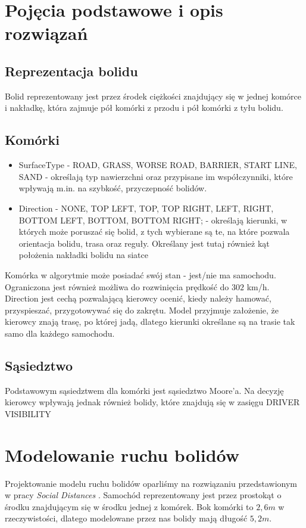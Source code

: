 \documentclass{article}
\begin{document}
\section{Pojęcia podstawowe i opis rozwiązań}
\subsection{Reprezentacja bolidu}
Bolid reprezentowany jest przez środek ciężkości znajdujący się w jednej komórce i nakładkę, która zajmuje pół komórki z przodu i pół komórki z tyłu bolidu.

\subsection{Komórki}
\begin{itemize}
\item SurfaceType - ROAD, GRASS, WORSE ROAD, BARRIER, START LINE, SAND - określają typ nawierzchni oraz przypisane im współczynniki, które wpływają m.in. na szybkość, przyczepność bolidów. 
\item Direction -  NONE, TOP LEFT, TOP, TOP RIGHT, LEFT, RIGHT, BOTTOM LEFT, BOTTOM, BOTTOM RIGHT; - określają kierunki, w których może poruszać się bolid, z tych wybierane są te, na które pozwala orientacja bolidu, trasa oraz reguły. Określany jest tutaj również kąt położenia nakładki bolidu na siatce
\end{itemize}

Komórka w algorytmie może posiadać swój stan - jest/nie ma samochodu. Ograniczona jest również możliwa do rozwinięcia prędkość do $302$ km/h. \\

Direction jest cechą pozwalającą kierowcy ocenić, kiedy należy hamować, przyspieszać, przygotowywać się do zakrętu. Model przyjmuje założenie, że kierowcy znają trasę, po której jadą, dlatego kierunki określane są na trasie tak samo dla każdego samochodu.

\subsection{Sąsiedztwo}
Podstawowym sąsiedztwem dla komórki jest sąsiedztwo Moore'a. Na decyzję kierowcy wpływają jednak również bolidy, które znajdują się w zasięgu DRIVER VISIBILITY

\section{Modelowanie ruchu bolidów}
Projektowanie modelu ruchu bolidów oparliśmy na rozwiązaniu przedstawionym w pracy \textit{Social Distances} \cite{was}. Samochód reprezentowany jest przez prostokąt o środku znajdującym się w środku jednej z komórek. Bok komórki to $2,6 m$ w rzeczywistości, dlatego modelowane przez nas bolidy mają długość $5,2 m$.
\end{document}
